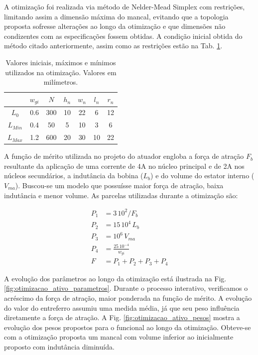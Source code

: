 A otimização foi realizada via método de Nelder-Mead Simplex com restrições, limitando assim a dimensão máxima do mancal, evitando que a topologia proposta sofresse alterações ao longo da otimização e que dimensões não condizentes com as especificações fossem obtidas. A condição inicial obtida do método citado anteriormente, assim como as restrições estão na Tab. \ref{tab:ativo:restrições}.

\begin{table}[ht!]
	\centering
	\begin{tabular}{c c c c c c c}
					 & $w_{gi}$ & $N$ & $h_n$ & $w_n$ & $l_n$ & $r_n$ \\ \hline \hline
		$L_{0}$  &  0.6 & 300  &   10 &  22 & 6  &   12 \\
		$L_{Min}$&  0.4 & 50   &   5  &  10 & 3  &   6	\\
		$L_{Max}$ & 1.2 & 600  &   20 &  30 & 10 &   22
	\end{tabular} 
	\caption{Valores iniciais, máximos e mínimos utilizados na otimização. Valores em milímetros.}
	\label{tab:ativo:restrições} 
\end{table}

A função de mérito utilizada no projeto do atuador engloba a força de atração $F_b$ resultante da aplicação de uma corrente de 4A no núcleo principal e de 2A nos núcleos secundários, a indutância da bobina ($L_b$) e do volume do estator interno ($V_{ma}$). Buscou-se um modelo que possuísse maior força de atração, baixa indutância e menor volume. As parcelas utilizadas durante a otimização são: 

\begin{align}
	P_1 &= 3 \, 10^2/ F_b \\
	P_2 &= 15 \, 10^4 \, L_b \\
	P_3 &= 10^6 \, V_{ma} \\
	P_4 &= \frac{25 \, 10^{-4}}{w_{gi}}				\\
	F   &= P_1 + P_2 + P_3 + P_4
\end{align}

A evolução dos parâmetros ao longo da otimização está ilustrada na Fig. \ref{fig:otimizacao_ativo_parametros}. Durante o processo interativo, verificamos o acréscimo da força de atração, maior ponderada na função de mérito.  A evolução do valor do entreferro assumiu uma medida média, já que seu peso influência diretamente a força de atração. A Fig. \ref{fig:otimizacao_ativo_pesos} mostra a evolução dos pesos propostos para o funcional ao longo da otimização. Obteve-se com a otimização proposta um mancal com volume inferior ao inicialmente proposto com indutância diminuída.

